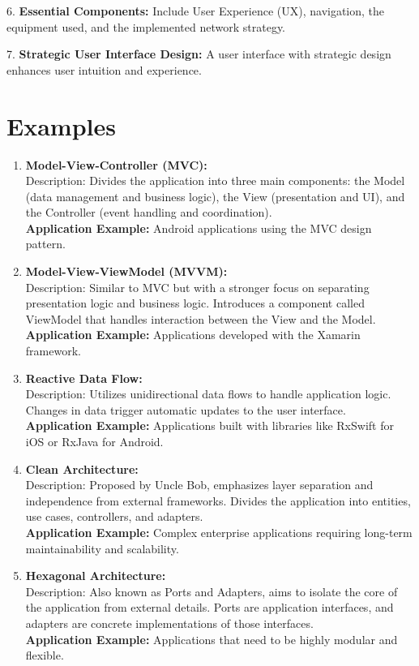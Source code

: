 \documentclass{article}
\begin{document}
6. \textbf{Essential Components:} Include User Experience (UX), navigation, the equipment used, and the implemented network strategy.

7. \textbf{Strategic User Interface Design:} A user interface with strategic design enhances user intuition and experience.


\section{Examples}

    \begin{enumerate}
    \item \textbf{Model-View-Controller (MVC):}\\
    Description: Divides the application into three main components: the Model (data management and business logic), the View (presentation and UI), and the Controller (event handling and coordination).\\
    \textbf{Application Example:} Android applications using the MVC design pattern.\\

    \item \textbf{Model-View-ViewModel (MVVM):}\\
    Description: Similar to MVC but with a stronger focus on separating presentation logic and business logic. Introduces a component called ViewModel that handles interaction between the View and the Model.\\
    \textbf{Application Example:} Applications developed with the Xamarin framework.\\

    \item \textbf{Reactive Data Flow:}\\
    Description: Utilizes unidirectional data flows to handle application logic. Changes in data trigger automatic updates to the user interface.\\
    \textbf{Application Example:} Applications built with libraries like RxSwift for iOS or RxJava for Android.\\

    \item \textbf{Clean Architecture:}\\
    Description: Proposed by Uncle Bob, emphasizes layer separation and independence from external frameworks. Divides the application into entities, use cases, controllers, and adapters.\\
    \textbf{Application Example:} Complex enterprise applications requiring long-term maintainability and scalability.\\

    \item \textbf{Hexagonal Architecture:}\\
    Description: Also known as Ports and Adapters, aims to isolate the core of the application from external details. Ports are application interfaces, and adapters are concrete implementations of those interfaces.\\
    \textbf{Application Example:} Applications that need to be highly modular and flexible.
\end{enumerate}
\end{document}
